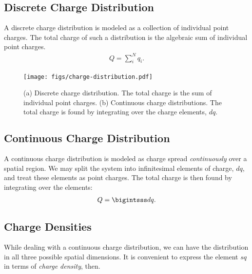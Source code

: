\documentclass[12pt,b4paper]{article}
\begin{document}
\subsection{Discrete Charge Distribution}
A discrete charge distribution is modeled as a collection of individual point charges. The total charge of such a distribution is the algebraic sum of individual point charges.
\begin{align}
    Q=\sum_i^Nq_i.
\end{align}
\begin{figure}[H]
    \centering
    \texttt{[image: figs/charge-distribution.pdf]}
    \caption{(a) Discrete charge distribution. The total charge is the sum of individual point charges. (b) Continuous charge distributions. The total charge is found by integrating over the charge elements, $dq$.}
    \label{fig:charge-distribution}
\end{figure}
\subsection{Continuous Charge Distribution}
A continuous charge distribution is modeled as charge spread \textit{continuously} over a spatial region. We may split the system into infinitesimal elements of charge, $dq$, and treat these elements as point charges. The total charge is then found by integrating over the elements:
\begin{align}
    Q=\bigintsss dq.
\end{align}
\subsection*{Charge Densities}
While dealing with a continuous charge distribution, we can have the distribution in all three possible spatial dimensions. It is convenient to express the element $sq$ in terms of \textit{charge density}, then.
\end{document}
